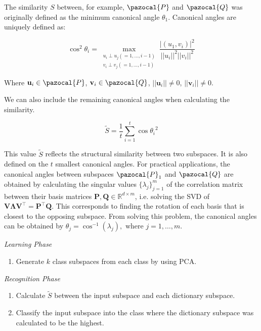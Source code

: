 The similarity $S$ between, for example, $\pazocal{P}$ and $\pazocal{Q}$ was originally defined as the minimum canonical angle $\theta_1$. Canonical angles \cite{chatelin2012} are uniquely defined as:

\[    \cos^2 \theta_i = \max_{\substack{u_i \perp u_j(=1,...,i−1) \\ v_i \perp v_j(=1,...,i−1)}} \frac{|(u_1,v_i)|^2}{||u_i||^2||v_i||^2}\]

Where $\mathbf{u}_i \in \pazocal{P}$, $\mathbf{v}_i \in \pazocal{Q}$, $||\mathbf{u}_i|| \neq 0$, $||\mathbf{v}_i|| \neq 0$.

We can also include the remaining canonical angles when calculating the similarity.


\[    \tilde{S} = \frac{1}{t} \sum^{t}_{i=1}\cos{\theta_i}^2 \]

This value $\tilde{S}$ reflects the structural similarity between two subspaces. It is also defined on the $t$ smallest canonical angles. For practical applications, the canonical angles between subspaces $\pazocal{P}_1$ and $\pazocal{Q}$ are obtained by calculating the singular values $\{\lambda_j\}_{j=1}^{m}$ of the correlation matrix between their basis matrices $\mathbf{P}, \mathbf{Q} \in \mathbb{R}^{d{\times}m}$, i.e. solving the SVD of $\mathbf{V}\mathbf{\Lambda}\mathbf{V}^{\top} = \mathbf{P}^{\top}\mathbf{Q}$. This corresponds to finding the rotation of each basis that is closest to the opposing subspace. From solving this problem, the canonical angles can be obtained by $\theta_j = \cos^{-1}(\lambda_j), \text{ where } j = 1, \ldots, m$.

{\setlength{\parindent}{0cm} \vspace{5mm}

\emph{Learning Phase}

\begin{enumerate}
    \item Generate $k$ class subspaces from each class by using PCA.
\end{enumerate}

\emph{Recognition Phase}

\begin{enumerate}
    \item Calculate $\tilde{S}$ between the input subspace and each dictionary subspace.
    \item Classify the input subspace into the class where the dictionary subspace was calculated to be the highest.
\end{enumerate}
}
\newpage


